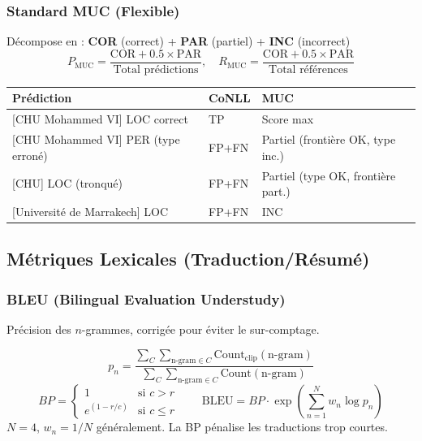 \documentclass[a4paper,10pt]{article}
\begin{document}
\subsubsection{Standard MUC (Flexible)}
Décompose en : \textbf{COR} (correct) + \textbf{PAR} (partiel) + \textbf{INC} (incorrect)
\[
P_{\text{MUC}} = \frac{\text{COR} + 0.5 \times \text{PAR}}{\text{Total prédictions}}, \quad R_{\text{MUC}} = \frac{\text{COR} + 0.5 \times \text{PAR}}{\text{Total références}}
\]


\begin{tabular}{lll}
\toprule
\textbf{Prédiction} & \textbf{CoNLL} & \textbf{MUC} \\
\midrule
{[CHU Mohammed VI]} LOC correct & TP & Score max \\
{[CHU Mohammed VI]} PER (type erroné) & FP+FN & Partiel (frontière OK, type inc.) \\
{[CHU]} LOC (tronqué) & FP+FN & Partiel (type OK, frontière part.) \\
{[Université de Marrakech]} LOC & FP+FN & INC \\
\bottomrule
\end{tabular}

\subsection{Métriques Lexicales (Traduction/Résumé)}

\subsubsection{BLEU (Bilingual Evaluation Understudy)}

\begin{definitionbox}
Précision des $n$-grammes, corrigée pour éviter le sur-comptage.
\end{definitionbox}

\begin{formulebox}
\[
p_n = \frac{\sum_C \sum_{\text{n-gram} \in C} \text{Count}_{\text{clip}}(\text{n-gram})}{\sum_C \sum_{\text{n-gram} \in C} \text{Count}(\text{n-gram})}
\]
\[
BP = \begin{cases} 1 & \text{si } c > r \\ e^{(1-r/c)} & \text{si } c \leq r \end{cases}
\qquad
\text{BLEU} = BP \cdot \exp\!\left(\sum_{n=1}^{N} w_n \log p_n\right)
\]
$N=4$, $w_n = 1/N$ généralement. La BP pénalise les traductions trop courtes.
\end{formulebox}
\end{document}
